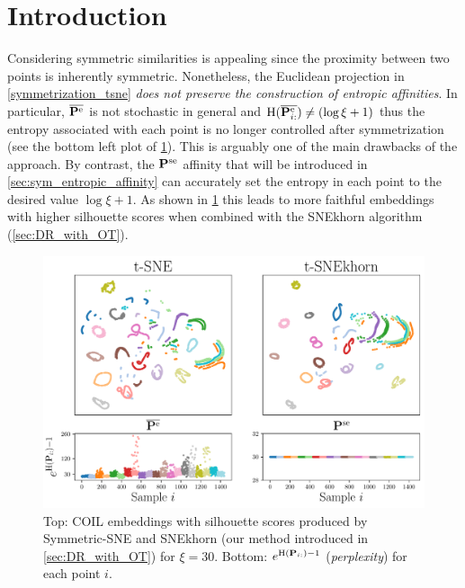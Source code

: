 
\section{Introduction}

Considering symmetric similarities is appealing since the proximity between two
points is inherently symmetric. Nonetheless, the Euclidean projection in
\eqref{symmetrization_tsne} \emph{does not preserve the construction of entropic
affinities}.  In particular, $\overline{\mathbf{P}^{\mathrm{e}}}$ is not stochastic in
general and $\operatorname{H}(\overline{\mathbf{P}_{i:}^{\mathrm{e}}}) \neq (\log{\xi} + 1)$ thus the entropy associated with each point is no longer controlled after symmetrization (see the bottom left plot of \cref{fig:coil}). This is
arguably one of the main drawbacks of the approach. By contrast, the
$\mathbf{P}^{\mathrm{se}}$ affinity that will be introduced in \cref{sec:sym_entropic_affinity} can
accurately set the entropy in each point to the desired value $\log \xi + 1$.  As shown in \cref{fig:coil} this leads to more faithful embeddings with higher silhouette scores when combined with the SNEkhorn algorithm (\cref{sec:DR_with_OT}).

\begin{figure}
    \centering
    \includegraphics[width=0.8\linewidth]{figures/SNEkhorn/fig_coil.pdf}
    \caption{Top: COIL \cite{nene1996columbia} embeddings with silhouette scores produced by Symmetric-SNE and SNEkhorn (our method introduced in  \cref{sec:DR_with_OT}) for $\xi=30$. Bottom: $e^{\operatorname{H}(\mathbf{P}_{i:})-1}$ (\emph{perplexity}) for each point $i$.}
    \label{fig:coil}
\end{figure}

